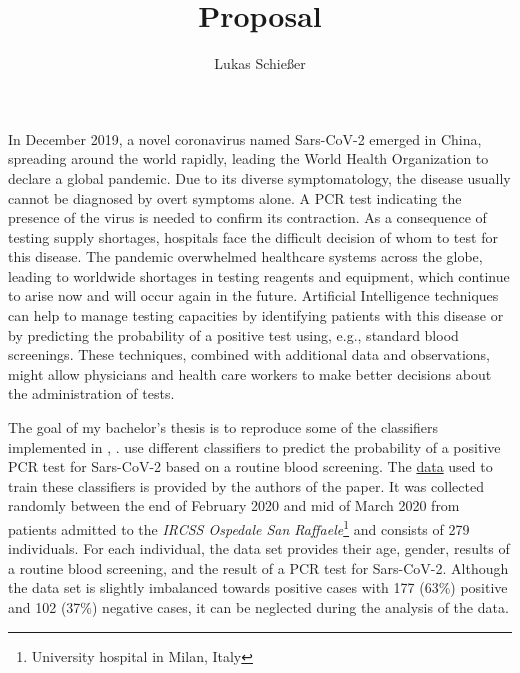 \documentclass[12pt,a4paper,oneside]{article}
\title{Proposal}
\author{Lukas Schießer}
\date{}
\begin{document}
\maketitle
In December 2019, a novel coronavirus named Sars-CoV-2 emerged in China, spreading around the world rapidly, leading the World Health Organization to declare a global pandemic. Due to its diverse symptomatology, the disease usually cannot be diagnosed by overt symptoms alone. A PCR test indicating the presence of the virus is needed to confirm its contraction.
As a consequence of testing supply shortages, hospitals face the difficult decision of whom to test for this disease.
The pandemic overwhelmed healthcare systems across the globe, leading to worldwide shortages in testing reagents and equipment, which continue to arise now and will occur again in the future. \cite{jaecklin_2020, asm.org_2020}
Artificial Intelligence techniques can help to manage testing capacities by identifying patients with this disease or by predicting the probability of a positive test using, e.g., standard blood screenings. These techniques, combined with additional data and observations, might allow physicians and health care workers to make better decisions about the administration of tests.
\par
The goal of my bachelor's thesis is to reproduce some of the classifiers implemented in \citeauthor{RN127}, \citeyear{RN127} \cite{RN127}. \citeauthor{RN127} use different classifiers to predict the probability of a positive PCR test for Sars-CoV-2 based on a routine blood screening. The \href{https://zenodo.org/record/3886927/files/covid_study_v2.xlsx?download=1}{data} used to train these classifiers is provided by the authors of the paper. It was collected randomly between the end of February 2020 and mid of March 2020 from patients admitted to the \textit{IRCSS Ospedale San Raffaele}\footnote{University hospital in Milan, Italy} and consists of 279 individuals. For each individual, the data set provides their age, gender, results of a routine blood screening, and the result of a PCR test for Sars-CoV-2. Although the data set is slightly imbalanced towards positive cases with 177 (63\%) positive and 102 (37\%) negative cases, it can be neglected during the analysis of the data.
\par
\end{document}
